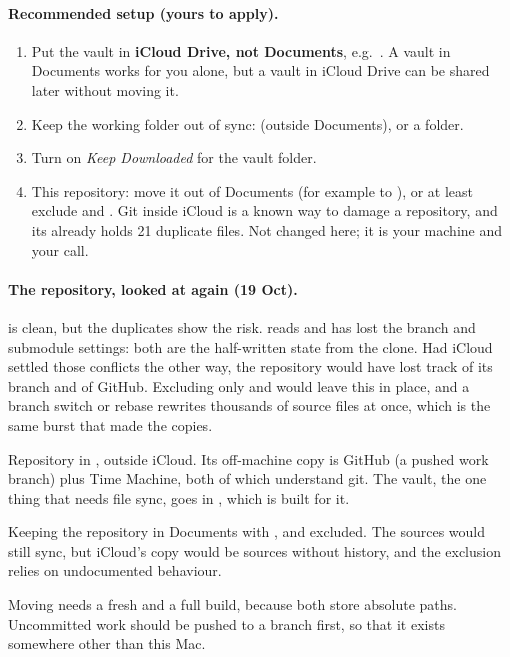 \paragraph{Recommended setup (yours to apply).}
\begin{enumerate}[nosep]
  \item Put the vault in \textbf{iCloud Drive, not Documents}, e.g.\ . A vault in
        Documents works for you alone, but a vault in iCloud Drive can be shared later without moving it.
  \item Keep the working folder out of sync:  (outside Documents), or a
         folder.
  \item Turn on \emph{Keep Downloaded} for the vault folder.
  \item This repository: move it out of Documents (for example to ), or at least
        exclude  and . Git inside iCloud is a known way to damage a repository, and its
         already holds 21 duplicate files. Not changed here; it is your machine and your call.
\end{enumerate}

\paragraph{The repository, looked at again (19 Oct).}  is clean, but the duplicates show the risk.
 reads  and  has lost the branch and submodule
settings: both are the half-written state from the clone. Had iCloud settled those conflicts the other way, the
repository would have lost track of its branch and of GitHub. Excluding only  and  would
leave this in place, and a branch switch or rebase rewrites thousands of source files at once, which is the same
burst that made the copies.
\begin{description}[leftmargin=0pt,nosep]
  \item[Recommended.] Repository in , outside iCloud. Its off-machine copy is GitHub
        (a pushed work branch) plus Time Machine, both of which understand git. The vault, the one thing that needs
        file sync, goes in , which is built for it.
  \item[Not recommended.] Keeping the repository in Documents with ,  and 
        excluded. The sources would still sync, but iCloud's copy would be sources without history, and the exclusion
        relies on undocumented behaviour.
\end{description}
Moving needs a fresh  and a full build, because both store absolute paths. Uncommitted work should
be pushed to a branch first, so that it exists somewhere other than this Mac.

